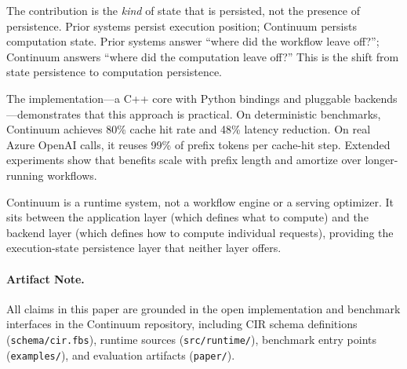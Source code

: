 \documentclass[10pt,twocolumn]{article}
\begin{document}
The contribution is the \emph{kind} of state that is persisted, not the presence of persistence. Prior systems persist execution position; Continuum persists computation state. Prior systems answer ``where did the workflow leave off?''; Continuum answers ``where did the computation leave off?'' This is the shift from state persistence to computation persistence.

The implementation---a C++ core with Python bindings and pluggable backends---demonstrates that this approach is practical. On deterministic benchmarks, Continuum achieves 80\% cache hit rate and 48\% latency reduction. On real Azure OpenAI calls, it reuses 99\% of prefix tokens per cache-hit step. Extended experiments show that benefits scale with prefix length and amortize over longer-running workflows.

Continuum is a runtime system, not a workflow engine or a serving optimizer. It sits between the application layer (which defines what to compute) and the backend layer (which defines how to compute individual requests), providing the execution-state persistence layer that neither layer offers.

\paragraph{Artifact Note.}
All claims in this paper are grounded in the open implementation and benchmark interfaces in the Continuum repository, including CIR schema definitions (\texttt{schema/cir.fbs}), runtime sources (\texttt{src/runtime/}), benchmark entry points (\texttt{examples/}), and evaluation artifacts (\texttt{paper/}).



\end{document}
